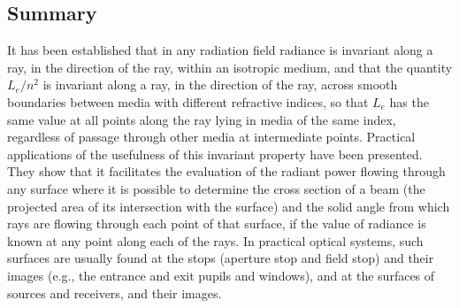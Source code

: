 \begin{refsection}
\section{Summary}

It has been established that in any radiation field radiance is invariant along
a ray, in the direction of the ray, within an isotropic medium, and that the
quantity $L_e/n^2$ is invariant along a ray, in the direction of the ray,
across smooth boundaries between media with different refractive indices,
so that $L_e$ has the same value at all points along the ray lying in media
of the same index, regardless of passage through other media at intermediate
points. Practical applications of the usefulness of this invariant property have
been presented. They show that it facilitates the evaluation of the radiant
power
flowing through any surface where it is possible to determine the cross section
of a beam (the projected area of its intersection with the surface) and the
solid
angle from which rays are flowing through each point of that surface, if the
value
of radiance is known at any point along each of the rays. In practical optical
systems,
such surfaces are usually found at the stops (aperture stop and field stop) and
their images (e.g., the entrance and exit pupils and windows), and at the
surfaces
of sources and receivers, and their images.


\end{refsection}

